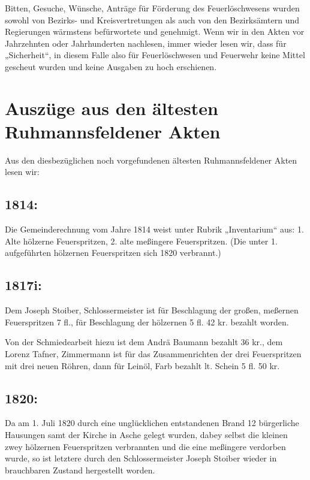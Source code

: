 \documentclass[12pt,a4paper]{book}
\begin{document}
Bitten, Gesuche, Wünsche, Anträge für Förderung des Feuerlöschwesens wurden
sowohl von Bezirks- und Kreisvertretungen als auch von den Bezirksämtern und
Regierungen wärmstens befürwortete und genehmigt. Wenn wir in den Akten vor
Jahrzehnten oder Jahrhunderten nachlesen, immer wieder lesen wir, dass für
„Sicherheit“, in diesem Falle also für Feuerlöschwesen und Feuerwehr keine
Mittel gescheut wurden und keine Ausgaben zu hoch erschienen.

\chapter{Auszüge aus den ältesten Ruhmannsfeldener Akten}

Aus den diesbezüglichen noch vorgefundenen ältesten Ruhmannsfeldener Akten lesen
wir:

\section{1814:}

Die Gemeinderechnung vom Jahre 1814 weist unter Rubrik „Inventarium“ aus: 1.
Alte hölzerne Feuerspritzen, 2. alte meßingere Feuerspritzen. (Die unter 1.
aufgeführten hölzernen Feuerspritzen sich 1820 verbrannt.)

\section{1817i:}

Dem Joseph Stoiber, Schlossermeister ist für Beschlagung der großen, meßernen
Feuerspritzen 7 fl., für Beschlagung der hölzernen 5 fl. 42 kr. bezahlt worden.

Von der Schmiedearbeit hiezu ist dem Andrä Baumann bezahlt 36 kr., dem Lorenz
Tafner, Zimmermann ist für das Zusammenrichten der drei Feuerspritzen mit drei
neuen Röhren, dann für Leinöl, Farb bezahlt lt. Schein 5 fl. 50 kr.

\section{1820:}

Da am 1. Juli 1820 durch eine unglücklichen entstandenen Brand 12 bürgerliche
Hausungen samt der Kirche in Asche gelegt wurden, dabey selbst die kleinen zwey
hölzernen Feuerspritzen verbrannten und die eine meßingere verdorben wurde, so
ist letztere durch den Schlossermeister Joseph Stoiber wieder in brauchbaren
Zustand hergestellt worden.
\end{document}
